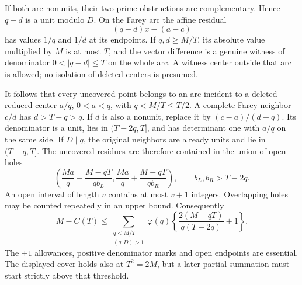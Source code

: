 \documentclass[11pt]{article}
\theoremstyle{definition}\newtheorem{definition}[theorem]{Definition}
\theoremstyle{remark}\newtheorem{remark}[theorem]{Remark}
\begin{document}
If both are nonunits, their two prime obstructions are complementary.
Hence \(q-d\) is a unit modulo \(D\).
On the Farey arc the affine residual
\[
 (q-d)x-(a-c)
\]
has values \(1/q\) and \(1/d\) at its endpoints.
If \(q,d\geq M/T\), its absolute value multiplied by \(M\) is at most \(T\),
and the vector difference is a genuine witness of denominator
\(0<|q-d|\leq T\) on the whole arc. A witness center outside that arc
is allowed; no isolation of deleted centers is presumed.

It follows that every uncovered point belongs to an arc incident to a
deleted reduced center \(a/q\), \(0<a<q\), with \(q<M/T\leq T/2\).
A complete Farey neighbor \(c/d\) has \(d>T-q>q\).
If \(d\) is also a nonunit, replace it by
\((c-a)/(d-q)\). Its denominator is a unit, lies in \((T-2q,T]\),
and has determinant one with \(a/q\) on the same side.
If \(D\mid q\), the original neighbors are already units and lie in
\((T-q,T]\).
The uncovered residues are therefore contained in the union of open holes
\[
 \left(\frac{Ma}{q}-\frac{M-qT}{qb_L},
       \frac{Ma}{q}+\frac{M-qT}{qb_R}\right),\qquad
 b_L,b_R>T-2q .
\]
An open interval of length \(v\) contains at most \(v+1\) integers.
Overlapping holes may be counted repeatedly in an upper bound. Consequently
\begin{equation}
 M-C(T)\leq
 \sum_{\substack{q<M/T\\(q,D)>1}}\varphi(q)
 \left\{\frac{2(M-qT)}{q(T-2q)}+1\right\}.
 \label{ap:far-holes}
\end{equation}
The \(+1\) allowances, positive denominator marks and open endpoints are
essential. The displayed cover holds also at \(T^2=2M\), but a later
partial summation must start strictly above that threshold.
\end{document}
